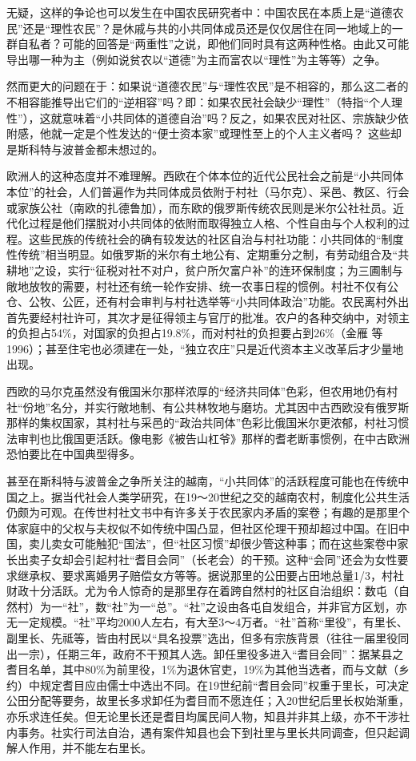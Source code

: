 \documentclass[a4paper,12pt,punct=kaiming,fontset=none]{ctexart}
\begin{document}
无疑，这样的争论也可以发生在中国农民研究者中：中国农民在本质上是“道德农民”还是“理性农民”？是休戚与共的小共同体成员还是仅仅居住在同一地域上的一群自私者？可能的回答是“两重性”之说，即他们同时具有这两种性格。由此又可能导出哪一种为主（例如说贫农以“道德”为主而富农以“理性”为主等等）之争。

然而更大的问题在于：如果说“道德农民”与“理性农民”是不相容的，那么这二者的不相容能推导出它们的“逆相容”吗？即：如果农民社会缺少“理性”（特指“个人理性”），这就意味着“小共同体的道德自治”吗？反之，如果农民对社区、宗族缺少依附感，他就一定是个性发达的“便士资本家”或理性至上的个人主义者吗？ 这些却是斯科特与波普金都未想过的。

欧洲人的这种态度并不难理解。西欧在个体本位的近代公民社会之前是“小共同体本位”的社会，人们普遍作为共同体成员依附于村社（马尔克）、采邑、教区、行会或家族公社（南欧的扎德鲁加），而东欧的俄罗斯传统农民则是米尔公社社员。近代化过程是他们摆脱对小共同体的依附而取得独立人格、个性自由与个人权利的过程。这些民族的传统社会的确有较发达的社区自治与村社功能：小共同体的“制度性传统”相当明显。如俄罗斯的米尔有土地公有、定期重分之制，有劳动组合及“共耕地”之设，实行“征税对社不对户，贫户所欠富户补”的连环保制度；为三圃制与敞地放牧的需要，村社还有统一轮作安排、统一农事日程的惯例。村社不仅有公仓、公牧、公匠，还有村会审判与村社选举等“小共同体政治”功能。农民离村外出首先要经村社许可，其次才是征得领主与官厅的批准。农户的各种交纳中，对领主的负担占54\%，对国家的负担占19.8\%，而对村社的负担要占到26\%（金雁 等 1996）；甚至住宅也必须建在一处，“独立农庄”只是近代资本主义改革后才少量地出现。

西欧的马尔克虽然没有俄国米尔那样浓厚的“经济共同体”色彩，但农用地仍有村社“份地”名分，并实行敞地制、有公共林牧地与磨坊。尤其因中古西欧没有俄罗斯那样的集权国家，其村社与采邑的“政治共同体”色彩比俄国米尔更浓郁，村社习惯法审判也比俄国更活跃。像电影《被告山杠爷》那样的耆老断事惯例，在中古欧洲恐怕要比在中国典型得多。

甚至在斯科特与波普金之争所关注的越南，“小共同体”的活跃程度可能也在传统中国之上。据当代社会人类学研究，在19～20世纪之交的越南农村，制度化公共生活仍颇为可观。在传世村社文书中有许多关于农民家内矛盾的案卷；有趣的是那里个体家庭中的父权与夫权似不如传统中国凸显，但社区伦理干预却超过中国。在旧中国，卖儿卖女可能触犯“国法”，但“社区习惯”却很少管这种事；而在这些案卷中家长出卖子女却会引起村社“耆目会同”（长老会）的干预。这种“会同”还会为女性要求继承权、要求离婚男子赔偿女方等等。据说那里的公田要占田地总量1/3，村社财政十分活跃。尤为令人惊奇的是那里存在着跨自然村的社区自治组织：数屯（自然村）为一“社”，数“社”为一“总”。“社”之设由各屯自发组合，并非官方区划，亦无一定规模。“社”平均2000人左右，有大至3～4万者。“社”首称“里役”，有里长、副里长、先祗等，皆由村民以“具名投票”选出，但多有宗族背景（往往一届里役同出一宗），任期三年，政府不干预其人选。卸任里役多进入“耆目会同”：据某县之耆目名单，其中80\%为前里役，1\%为退休官吏，19\%为其他当选者，而与文献（乡约）中规定耆目应由儒士中选出不同。在19世纪前“耆目会同”权重于里长，可决定公田分配等要务，故里长多求卸任为耆目而不愿连任；入20世纪后里长权始渐重，亦乐求连任矣。但无论里长还是耆目均属民间人物，知县并非其上级，亦不干涉社内事务。社实行司法自治，遇有案件知县也会下到社里与里长共同调查，但只起调解人作用，并不能左右里长。
\end{document}
